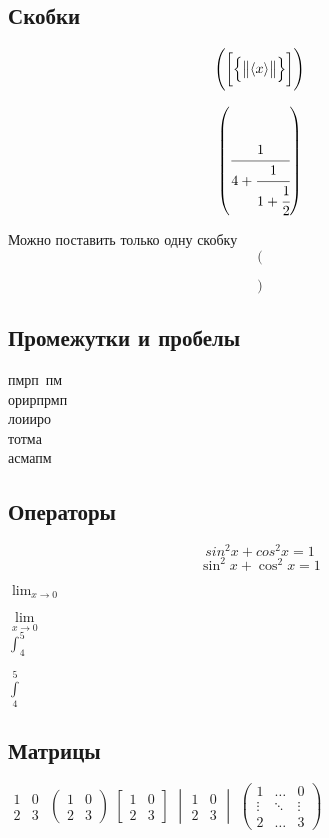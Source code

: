 \documentclass[12pt]{article}
\begin{document}
\subsection{Скобки}

$$\Biggl(
\biggl[
\Bigl\{
\bigl\|
\langle x \rangle
\bigr\|
\Bigr\}
\biggr]
\Biggr)$$

$$\left(\cfrac{1}{4+\cfrac1{1+\cfrac12}}\right)$$ 

Можно поставить только одну скобку
$$\biggl($$

$$\left. \right)$$

\subsection{Промежутки и пробелы}
пмрп \,пм\\
орир\:прмп\\
лои\;иро\\
тот\qquad ма \\

ас\!мапм

\subsection{Операторы}

$$sin^2x+cos^2x=1$$
$$\sin^2x+\cos^2x=1$$

$\lim_{x \to 0}$

$\lim\limits_{x \to 0}$\\

$\int_4^5$

$\int\limits_4^5$

\subsection{Матрицы}

$\begin{matrix}
1 & 0\\ 
2 & 3
\end{matrix}$
$\begin{pmatrix}
1 & 0\\ 
2 & 3
\end{pmatrix}$
$\begin{bmatrix}
1 & 0\\ 
2 & 3
\end{bmatrix}$
$\begin{vmatrix}
1 & 0\\ 
2 & 3
\end{vmatrix}$
$\begin{pmatrix}
1 & \dots & 0\\ 
\vdots & \ddots & \vdots\\
2 & \dots & 3
\end{pmatrix}$
\end{document}
